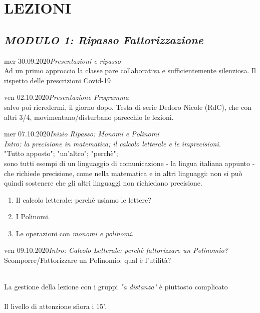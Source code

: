 \documentclass[10pt, a4paper twoside, notitlepage, notoc, justified]{tufte-handout}
\begin{document}
\newpage
\section{\small \bf LEZIONI}
\subsection{\small \bf {\em MODULO 1: Ripasso Fattorizzazione}}
\begin{loggentry}{mer 30.09.2020}{\em Presentazioni e ripasso}\\
Ad un primo approccio la classe pare collaborativa e sufficientemente silenziosa.
Il rispetto delle prescrizioni Covid-19
\end{loggentry}

\begin{loggentry}{ven 02.10.2020}{\em Presentazione Programma}\\
salvo poi ricredermi, il giorno dopo. Testa di serie Dedoro Nicole (RdC), che con altri 3/4, movimentano/disturbano parecchio le lezioni.
\end{loggentry}

\begin{loggentry}{mer 07.10.2020}{\em Inizio Ripasso: Monomi e Polinomi}\\
{\em Intro: la precisione in matematica; il calcolo letterale e le imprecisioni.}\\
"Tutto apposto"; "un'altro"; "perchè";\\ sono tutti esempi di un linguaggio di comunicazione - la lingua italiana appunto - che richiede precisione, come nella matematica e in altri linguaggi: non si può quindi sostenere che gli altri linguaggi non richiedano precisione. 
\begin{enumerate}
			\item Il calcolo letterale: perchè usiamo le lettere? 
			\item I Polinomi.
			\item Le operazioni con {\em monomi e polinomi}.
		\end{enumerate}
\end{loggentry}

\begin{loggentry}{ven 09.10.2020}{\em Intro: Calcolo Letterale: perchè fattorizzare un Polinomio?}\\
Scomporre/Fattorizzare un Polinomio: qual è l'utilità?
\end{loggentry}
\\ La gestione della lezione con i gruppi {\em "a distanza"} è piuttosto complicato\\
\\ Il livello di attenzione sfiora i 15'.\\
\end{document}

